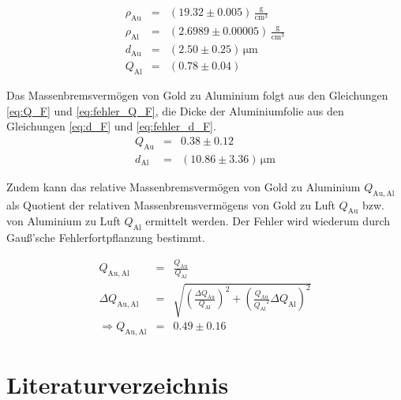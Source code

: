 \documentclass[12pt,a4paper]{scrartcl}
\numberwithin{equation}{section} %
\begin{document}
\begin{eqnarray}
	\rho_\mathrm{Au} &=& (19.32 \pm 0.005) \mathrm{\, \frac{g}{cm^3}}\\
	\rho_\mathrm{Al} &=& (2.6989 \pm 0.00005) \mathrm{\, \frac{g}{cm^3}}\\
	d_\mathrm{Au} &=& (2.50 \pm 0.25) \mathrm{\, \mu m}\\
	Q_\mathrm{Al} &=& (0.78 \pm 0.04)
\end{eqnarray}

Das Massenbremsvermögen von Gold zu Aluminium folgt aus den Gleichungen \eqref{eq:Q_F} und \eqref{eq:fehler_Q_F}, die Dicke der Aluminiumfolie aus den Gleichungen \eqref{eq:d_F} und \eqref{eq:fehler_d_F}.
\begin{eqnarray}
	Q_\mathrm{Au} &=& 0.38 \pm 0.12 \\
	d_\mathrm{Al} &=& (10.86 \pm 3.36) \mathrm{\, \mu m}
\end{eqnarray}

Zudem kann das relative Massenbremsvermögen von Gold zu Aluminium $Q_\mathrm{Au, Al}$ als Quotient der relativen Massenbremsvermögens von Gold zu Luft $Q_\mathrm{Au}$ bzw. von Aluminium zu Luft $Q_\mathrm{Al}$ ermittelt werden. Der Fehler wird wiederum durch Gauß'sche Fehlerfortpflanzung bestimmt.

\begin{eqnarray}
	Q_\mathrm{Au, Al} &=& \frac{Q_\mathrm{Au}}{Q_\mathrm{Al}} \\
	\Delta Q_\mathrm{Au, Al} &=&
		\sqrt{
				\left(\frac{\Delta Q_\mathrm{Au}}{Q_\mathrm{Al}}\right)^2
				+ \left(\frac{Q_\mathrm{Au}}{{Q_\mathrm{Al}}^2} \Delta Q_\mathrm{Al} \right)^2
			} \\
	\Rightarrow Q_\mathrm{Au, Al} &=& 0.49 \pm 0.16
\end{eqnarray}

\clearpage
\hypertarget{literatur}{%
\section{Literaturverzeichnis}\label{literatur}}
\renewcommand{\section}[2]{}
\end{document}
